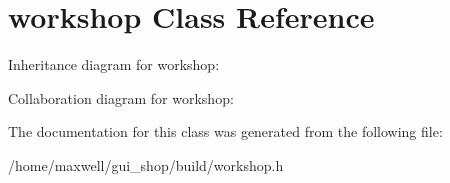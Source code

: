 \hypertarget{classworkshop}{}\section{workshop Class Reference}
\label{classworkshop}


Inheritance diagram for workshop\+:


Collaboration diagram for workshop\+:


The documentation for this class was generated from the following file\+:\begin{DoxyCompactItemize}
\item 
/home/maxwell/gui\+\_\+shop/build/workshop.\+h\end{DoxyCompactItemize}
